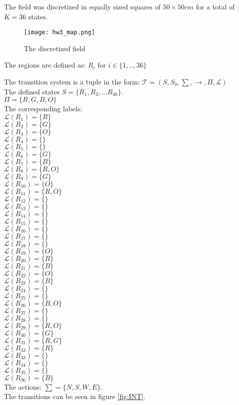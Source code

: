 The field was discretized in equally sized squares of $50 \times 50 cm$ for a total of $K=36$ states.  
 
 \begin{figure}[H]
 \centering
  \texttt{[image: hw3\_map.png]}
  \caption{The discretized field}
  \end{figure}

The regions are defined as: $R_i$ for $i\in \{1,..,36\}$


 The transition system is a tuple in the form:
$\mathcal{T}=(S,S_0,\sum,\rightarrow,\Pi,\mathcal{L})$\\
The defined states $S=\{R_1,R_2,...R_{36}\}.$\\
$\Pi=\{R,G,B,O\}$\\
The corresponding labels:\\
$\mathcal{L}(R_1)=\{R\}$\\
$\mathcal{L}(R_2)=\{G\}$\\
$\mathcal{L}(R_3)=\{O\}$\\
$\mathcal{L}(R_4)=\{\}$\\
$\mathcal{L}(R_5)=\{\}$\\
$\mathcal{L}(R_6)=\{G\}$\\
$\mathcal{L}(R_7)=\{B\}$\\
$\mathcal{L}(R_8)=\{R,O\}$\\
$\mathcal{L}(R_9)=\{G\}$\\
$\mathcal{L}(R_{10})=\{O\}$\\
$\mathcal{L}(R_{11})=\{R,O\}$\\
$\mathcal{L}(R_{12})=\{\}$\\
$\mathcal{L}(R_{13})=\{\}$\\
$\mathcal{L}(R_{14})=\{\}$\\
$\mathcal{L}(R_{15})=\{\}$\\
$\mathcal{L}(R_{16})=\{\}$\\
$\mathcal{L}(R_{17})=\{\}$\\
$\mathcal{L}(R_{18})=\{\}$\\
$\mathcal{L}(R_{19})=\{O\}$\\
$\mathcal{L}(R_{20})=\{R\}$\\
$\mathcal{L}(R_{21})=\{B\}$\\
$\mathcal{L}(R_{22})=\{O\}$\\
$\mathcal{L}(R_{23})=\{B\}$\\
$\mathcal{L}(R_{24})=\{\}$\\
$\mathcal{L}(R_{25})=\{\}$\\
$\mathcal{L}(R_{26})=\{B,O\}$\\
$\mathcal{L}(R_{27})=\{\}$\\
$\mathcal{L}(R_{28})=\{\}$\\
$\mathcal{L}(R_{29})=\{R,O\}$\\
$\mathcal{L}(R_{30})=\{G\}$\\
$\mathcal{L}(R_{31})=\{R,G\}$\\
$\mathcal{L}(R_{32})=\{R\}$\\
$\mathcal{L}(R_{33})=\{\}$\\
$\mathcal{L}(R_{34})=\{\}$\\
$\mathcal{L}(R_{35})=\{\}$\\
$\mathcal{L}(R_{36})=\{B\}$\\

The actions:
$\sum=\{N,S,W,E\}$.\\
The transitions can be seen in figure \ref{fig:INT}. 
